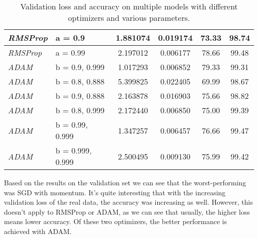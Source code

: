 {\begin{table}[h]
\begin{tabular}{|l|l|cc|cc|}
\textit{RMSProp} & a = 0.9 & \multicolumn{1}{c|}{1.881074} & 0.019174 & \multicolumn{1}{c|}{73.33} & 98.74 \\ \hline
\textit{RMSProp} & a = 0.99 & \multicolumn{1}{c|}{2.197012} & 0.006177 & \multicolumn{1}{c|}{78.66} & 99.48 \\ \hline
\textit{ADAM} & b = 0.9, 0.999 & \multicolumn{1}{c|}{1.017293} & 0.006852 & \multicolumn{1}{c|}{79.33} & 99.31 \\ \hline
\textit{ADAM} & b = 0.8, 0.888 & \multicolumn{1}{c|}{5.399825} & 0.022405 & \multicolumn{1}{c|}{69.99} & 98.67 \\ \hline
\textit{ADAM} & b = 0.9, 0.888 & \multicolumn{1}{c|}{2.163878} & 0.016903 & \multicolumn{1}{c|}{75.66} & 98.82 \\ \hline
\textit{ADAM} & b = 0.8, 0.999 & \multicolumn{1}{c|}{2.172440} & 0.006850 & \multicolumn{1}{c|}{75.00} & 99.39 \\ \hline
\textit{ADAM} & b = 0.99, 0.999 & \multicolumn{1}{c|}{1.347257} & 0.006457 & \multicolumn{1}{c|}{76.66} & 99.47 \\ \hline
\textit{ADAM} & b = 0.999, 0.999 & \multicolumn{1}{c|}{2.500495} & 0.009130 & \multicolumn{1}{c|}{75.99} & 99.42 \\ \hline
\end{tabular}
\caption{Validation loss and accuracy on multiple models with different optimizers and various parameters.}
\label{tab:optimizer1}
\end{table}
}


Based on the results on the validation set we can see that the worst-performing was SGD with momentum. It's quite interesting that with the increasing validation loss of the real data, the accuracy was increasing as well. However, this doesn't apply to RMSProp or ADAM, as we can see that usually, the higher loss means lower accuracy. Of these two optimizers, the better performance is achieved with ADAM. 
